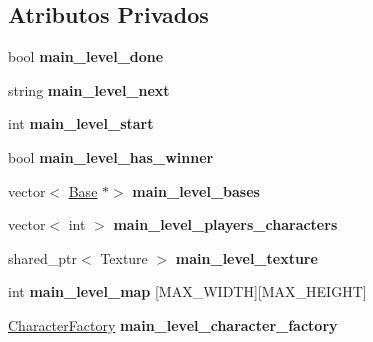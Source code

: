 \subsection*{Atributos Privados}
\begin{DoxyCompactItemize}
\item 
\mbox{\label{classMainLevel_ac73ac0af37dc694036a7da248d70ba75}} 
bool {\bfseries main\+\_\+level\+\_\+done}
\item 
\mbox{\label{classMainLevel_aa17ebbec1a36f9001ce5d8a9e282bbcf}} 
string {\bfseries main\+\_\+level\+\_\+next}
\item 
\mbox{\label{classMainLevel_a65bd52645923038402ab92b25af97b59}} 
int {\bfseries main\+\_\+level\+\_\+start}
\item 
\mbox{\label{classMainLevel_a6322c1a74e91e0b54dfa8368602963ad}} 
bool {\bfseries main\+\_\+level\+\_\+has\+\_\+winner}
\item 
\mbox{\label{classMainLevel_a8095418f188c09501ada69571a131594}} 
vector$<$ \mbox{\hyperlink{classBase}{Base}} $\ast$$>$ {\bfseries main\+\_\+level\+\_\+bases}
\item 
\mbox{\label{classMainLevel_a19560b2041a11b7780e5921b52dd7bb6}} 
vector$<$ int $>$ {\bfseries main\+\_\+level\+\_\+players\+\_\+characters}
\item 
\mbox{\label{classMainLevel_acf7f81373b053b58b0755934e5ec75b9}} 
shared\+\_\+ptr$<$ Texture $>$ {\bfseries main\+\_\+level\+\_\+texture}
\item 
\mbox{\label{classMainLevel_a67fb31550c22320459d70d1d8834238f}} 
int {\bfseries main\+\_\+level\+\_\+map} \mbox{[}M\+A\+X\+\_\+\+W\+I\+D\+TH\mbox{]}\mbox{[}M\+A\+X\+\_\+\+H\+E\+I\+G\+HT\mbox{]}
\item 
\mbox{\label{classMainLevel_a017084aa4aa83cfd18195025a6b5a703}} 
\mbox{\hyperlink{classCharacterFactory}{Character\+Factory}} {\bfseries main\+\_\+level\+\_\+character\+\_\+factory}
\end{DoxyCompactItemize}


